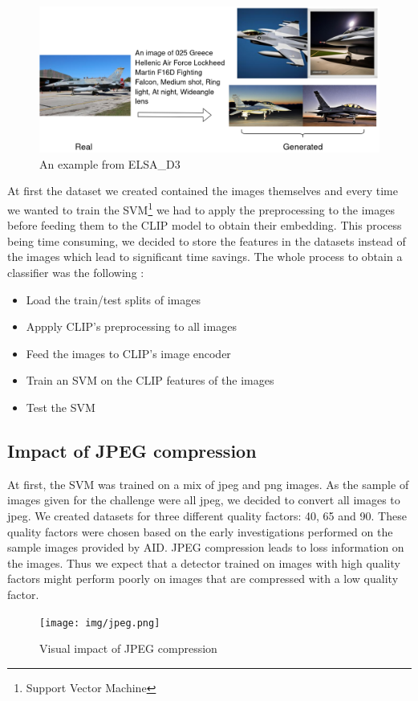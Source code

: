 \documentclass[12pt,a4paper]{article}
\begin{document}
\begin{figure}[H]
    \includegraphics*[width=\textwidth]{img/ELSA.png}
    \caption{An example from ELSA\_D3}
\end{figure}

At first the dataset we created contained the images themselves and every time we wanted to train the SVM\footnote{Support Vector Machine} we had to apply the preprocessing to the images before feeding them to the CLIP model to obtain their embedding. This process being time consuming, we decided to store the features in the datasets instead of the images which lead to significant time savings. The whole process to obtain a classifier was the following :
\begin{itemize}
    \item Load the train/test splits of images
    \item Appply CLIP's preprocessing to all images
    \item Feed the images to CLIP's image encoder
    \item Train an SVM on the CLIP features of the images
    \item Test the SVM
\end{itemize}

\subsection{Impact of JPEG compression}
At first, the SVM was trained on a mix of jpeg and png images. As the sample of images given for the challenge were all jpeg, we decided to convert all images to jpeg. We created datasets for three different quality factors: 40, 65 and 90. These quality factors were chosen based on the early investigations performed on the sample images provided by AID. JPEG compression leads to loss information on the images. Thus we expect that a detector trained on images with high quality factors might perform poorly on  images that are compressed with a low quality factor. 
\begin{figure}[H]
    \texttt{[image: img/jpeg.png]}
    \vspace*{-.8cm}
    \caption{Visual impact of JPEG compression}
\end{figure}
\end{document}
